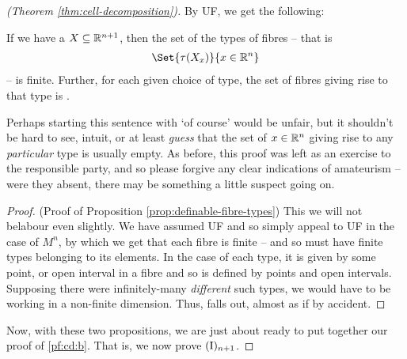 \begin{proof}[\CD (Theorem \ref{thm:cell-decomposition})]
    By UF, we get the following:
    \begin{proposition}
      If we have a  $X \subseteq \R^{n+1}$, then the set of the types of fibres -- that is
      \begin{align*}
        \Set{\tau(X_x)}{x \in \R^n}
      \end{align*}
      -- is finite. Further, for each given choice of type, the set of fibres giving rise to that type is .
      \label{prop:definable-fibre-types}
    \end{proposition}
    Perhaps starting this sentence with `of course' would be unfair, but it shouldn't be hard to see, intuit, or at least \emph{guess} that the set of $x \in \R^n$ giving rise to any \emph{particular} type is usually empty. As before, this proof was left as an exercise to the responsible party, and so please forgive any clear indications of amateurism -- were they absent, there may be something a little suspect going on.

    \begin{proof}(Proof of Proposition \ref{prop:definable-fibre-types})
      This we will not belabour even slightly. We have assumed UF and so simply appeal to UF in the case of $M^{n}$, by which we get that each fibre is finite -- and so must have finite types belonging to its elements. In the case of each type, it is given by some point, or open interval in a fibre and so is defined by points and open intervals. Supposing there were infinitely-many \emph{different} such types, we would have to be working in a non-finite dimension. Thus,  falls out, almost as if by accident.
      \smartqed
    \end{proof}

    Now, with these two propositions, we are just about ready to put together our proof of \ref{pf:cd:b}. That is, we now prove $\In[n+1]$.


\end{proof}
